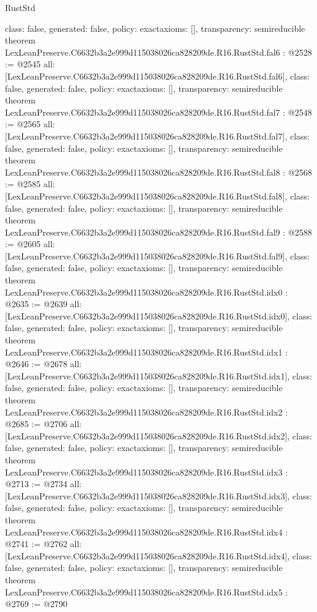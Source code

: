 \begin{lexlean}{RustStd}
\begin{coremodule}
{  class: false,
  generated: false,
  policy: exact{axioms: []},
  transparency: semireducible
}
theorem LexLeanPreserve.C6632b3a2e999d115038026ca828209de.R16.RustStd.fal6 : @2528 := @2545 {
  all: [LexLeanPreserve.C6632b3a2e999d115038026ca828209de.R16.RustStd.fal6],
  class: false,
  generated: false,
  policy: exact{axioms: []},
  transparency: semireducible
}
theorem LexLeanPreserve.C6632b3a2e999d115038026ca828209de.R16.RustStd.fal7 : @2548 := @2565 {
  all: [LexLeanPreserve.C6632b3a2e999d115038026ca828209de.R16.RustStd.fal7],
  class: false,
  generated: false,
  policy: exact{axioms: []},
  transparency: semireducible
}
theorem LexLeanPreserve.C6632b3a2e999d115038026ca828209de.R16.RustStd.fal8 : @2568 := @2585 {
  all: [LexLeanPreserve.C6632b3a2e999d115038026ca828209de.R16.RustStd.fal8],
  class: false,
  generated: false,
  policy: exact{axioms: []},
  transparency: semireducible
}
theorem LexLeanPreserve.C6632b3a2e999d115038026ca828209de.R16.RustStd.fal9 : @2588 := @2605 {
  all: [LexLeanPreserve.C6632b3a2e999d115038026ca828209de.R16.RustStd.fal9],
  class: false,
  generated: false,
  policy: exact{axioms: []},
  transparency: semireducible
}
theorem LexLeanPreserve.C6632b3a2e999d115038026ca828209de.R16.RustStd.idx0 : @2635 := @2639 {
  all: [LexLeanPreserve.C6632b3a2e999d115038026ca828209de.R16.RustStd.idx0],
  class: false,
  generated: false,
  policy: exact{axioms: []},
  transparency: semireducible
}
theorem LexLeanPreserve.C6632b3a2e999d115038026ca828209de.R16.RustStd.idx1 : @2646 := @2678 {
  all: [LexLeanPreserve.C6632b3a2e999d115038026ca828209de.R16.RustStd.idx1],
  class: false,
  generated: false,
  policy: exact{axioms: []},
  transparency: semireducible
}
theorem LexLeanPreserve.C6632b3a2e999d115038026ca828209de.R16.RustStd.idx2 : @2685 := @2706 {
  all: [LexLeanPreserve.C6632b3a2e999d115038026ca828209de.R16.RustStd.idx2],
  class: false,
  generated: false,
  policy: exact{axioms: []},
  transparency: semireducible
}
theorem LexLeanPreserve.C6632b3a2e999d115038026ca828209de.R16.RustStd.idx3 : @2713 := @2734 {
  all: [LexLeanPreserve.C6632b3a2e999d115038026ca828209de.R16.RustStd.idx3],
  class: false,
  generated: false,
  policy: exact{axioms: []},
  transparency: semireducible
}
theorem LexLeanPreserve.C6632b3a2e999d115038026ca828209de.R16.RustStd.idx4 : @2741 := @2762 {
  all: [LexLeanPreserve.C6632b3a2e999d115038026ca828209de.R16.RustStd.idx4],
  class: false,
  generated: false,
  policy: exact{axioms: []},
  transparency: semireducible
}
theorem LexLeanPreserve.C6632b3a2e999d115038026ca828209de.R16.RustStd.idx5 : @2769 := @2790 {
}
\end{coremodule}
\end{lexlean}
